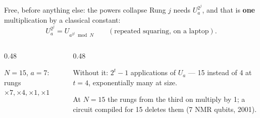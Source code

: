 \documentclass[aspectratio=169,11pt]{beamer}
\newcommand{\code}[2][]{}
\newcommand{\bundle}[3]{\draw[thick,color=body] (#1-0.07,#2-0.13) -- (#1+0.07,#2+0.13);
  \node[font=\tiny,color=subtle,above right=-1pt] at (#1,#2) {#3};}
\begin{document}
\begin{frame}[fragile]{Free, before anything else: the powers collapse}
  Rung $j$ needs $U_a^{2^j}$, and that is \textbf{one} multiplication by a classical constant:
  \[ U_a^{2^j}=U_{a^{2^j}\bmod N}\qquad(\text{repeated squaring, on a laptop}). \]
  \begin{columns}[c]
    \begin{column}{0.48\textwidth}
      \centering
      \par
      {\small $N=15$, $a=7$: rungs $\times7,\times4,\times1,\times1$}
    \end{column}
    \begin{column}{0.48\textwidth}
      \begin{greyblock}
        Without it: $2^t-1$ applications of $U_a$ --- 15 instead of 4 at $t=4$, exponentially many at size.
      \end{greyblock}
      {\small At $N=15$ the rungs from the third on multiply by 1; a circuit compiled for 15 deletes them (7 NMR qubits, 2001).}
    \end{column}
  \end{columns}
  \code[basicstyle=\ttfamily\footnotesize]{ladder.py}
\end{frame}
\end{document}
